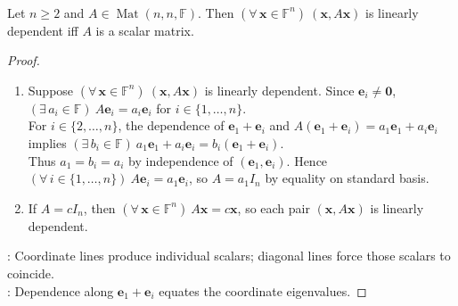 \begin{lemma} \label{lem:scalar-matrix-dependent-orbits} \\
Let $n\geq2$ and $A\in\operatorname{Mat}(n,n,\mathbb{F})$. Then $(\forall\,\mathbf{x}\in\mathbb{F}^n)\ (\mathbf{x},A\mathbf{x})$ is linearly dependent iff $A$ is a scalar matrix.
\begin{proof}
\begin{enumerate}[label=\roman*.]
\setlength{\itemsep}{0pt}
\item[$(\Rightarrow)$] Suppose $(\forall\,\mathbf{x}\in\mathbb{F}^n)\ (\mathbf{x},A\mathbf{x})$ is linearly dependent. Since $\mathbf{e}_i\neq\mathbf{0}$, $(\exists\,a_i\in\mathbb{F})\ A\mathbf{e}_i=a_i\mathbf{e}_i$ for $i\in\{1,\ldots,n\}$.\\
For $i\in\{2,\ldots,n\}$, the dependence of $\mathbf{e}_1+\mathbf{e}_i$ and $A(\mathbf{e}_1+\mathbf{e}_i)=a_1\mathbf{e}_1+a_i\mathbf{e}_i$ implies $(\exists\,b_i\in\mathbb{F})\ a_1\mathbf{e}_1+a_i\mathbf{e}_i=b_i(\mathbf{e}_1+\mathbf{e}_i)$.\\
Thus $a_1=b_i=a_i$ by independence of $(\mathbf{e}_1,\mathbf{e}_i)$. Hence $(\forall\,i\in\{1,\ldots,n\})\ A\mathbf{e}_i=a_1\mathbf{e}_i$, so $A=a_1I_n$ by equality on standard basis.
\item[$(\Leftarrow)$] If $A=cI_n$, then $(\forall\,\mathbf{x}\in\mathbb{F}^n)\ A\mathbf{x}=c\mathbf{x}$, so each pair $(\mathbf{x},A\mathbf{x})$ is linearly dependent.
\end{enumerate}
: Coordinate lines produce individual scalars; diagonal lines force those scalars to coincide.\\
: Dependence along $\mathbf{e}_1+\mathbf{e}_i$ equates the coordinate eigenvalues.
\end{proof}
\end{lemma}

